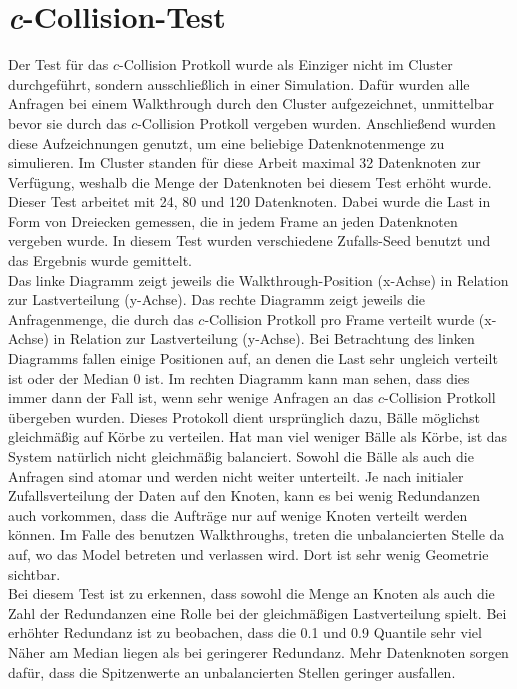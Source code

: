 \section{\textit{c}-Collision-Test}
\label{sec:eval:ccollision}

Der Test für das $c$-Collision Protkoll wurde als Einziger nicht im Cluster durchgeführt, sondern ausschließlich in einer Simulation. Dafür wurden alle Anfragen bei einem Walkthrough durch den Cluster aufgezeichnet, unmittelbar bevor sie durch das $c$-Collision Protkoll vergeben wurden. Anschließend wurden diese Aufzeichnungen genutzt, um eine beliebige Datenknotenmenge zu simulieren. Im Cluster standen für diese Arbeit maximal 32 Datenknoten zur Verfügung, weshalb die Menge der Datenknoten bei diesem Test erhöht wurde. Dieser Test arbeitet mit 24, 80 und 120 Datenknoten. Dabei wurde die Last in Form von Dreiecken gemessen, die in jedem Frame an jeden Datenknoten vergeben wurde. In diesem Test wurden verschiedene Zufalls-Seed benutzt und das Ergebnis wurde gemittelt.\\
Das linke Diagramm zeigt jeweils die Walkthrough-Position (x-Achse) in Relation zur Lastverteilung (y-Achse). Das rechte Diagramm zeigt jeweils die Anfragenmenge, die durch das $c$-Collision Protkoll pro Frame verteilt wurde (x-Achse) in Relation zur Lastverteilung (y-Achse). Bei Betrachtung des linken Diagramms fallen einige Positionen auf, an denen die Last sehr ungleich verteilt ist oder der Median 0 ist. Im rechten Diagramm kann man sehen, dass dies immer dann der Fall ist, wenn sehr wenige Anfragen an das $c$-Collision Protkoll übergeben wurden. Dieses Protokoll dient ursprünglich dazu, Bälle möglichst gleichmäßig auf Körbe zu verteilen. Hat man viel weniger Bälle als Körbe, ist das System natürlich nicht gleichmäßig balanciert. Sowohl die Bälle als auch die Anfragen sind atomar und werden nicht weiter unterteilt. Je nach initialer Zufallsverteilung der Daten auf den Knoten, kann es bei wenig Redundanzen auch vorkommen, dass die Aufträge nur auf wenige Knoten verteilt werden können. Im Falle des benutzen Walkthroughs, treten die unbalancierten Stelle da auf, wo das Model betreten und verlassen wird. Dort ist sehr wenig Geometrie sichtbar.\\
Bei diesem Test ist zu erkennen, dass sowohl die Menge an Knoten als auch die Zahl der Redundanzen eine Rolle bei der gleichmäßigen Lastverteilung spielt. Bei erhöhter Redundanz ist zu beobachen, dass die 0.1 und 0.9 Quantile sehr viel Näher am Median liegen als bei geringerer Redundanz. Mehr Datenknoten sorgen dafür, dass die Spitzenwerte an unbalancierten Stellen geringer ausfallen.

